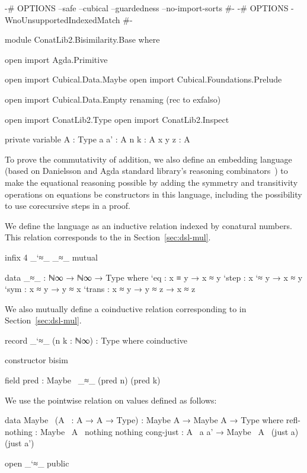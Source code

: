 \begin{code}[hide]
{-# OPTIONS --safe --cubical --guardedness --no-import-sorts #-}
{-# OPTIONS -WnoUnsupportedIndexedMatch #-}

module ConatLib2.Bisimilarity.Base where

open import Agda.Primitive

open import Cubical.Data.Maybe
open import Cubical.Foundations.Prelude

open import Cubical.Data.Empty
  renaming (rec to exfalso)

open import ConatLib2.Type
open import ConatLib2.Inspect

private variable
  A : Type
  a a' : A
  n k : A
  x y z : A
\end{code}
To prove the commutativity of addition, we also define an embedding language
(based on Danielsson \cite{danielsson-beating} and Agda standard library's
 reasoning combinators~\cite{agda-stdlib}) to make the equational
reasoning possible by adding the symmetry and transitivity operations on
equations be constructors in this language, including the possibility to use
corecursive steps in a proof.

We define the language as an inductive relation indexed by conatural numbers.
This relation corresponds to the  in
Section~\ref{sec:dsl-mul}.
\begin{code}[hide]
infix 4 _`≈_ _≈_
mutual
\end{code}
\begin{code}
  data _≈_ : ℕ∞ → ℕ∞ → Type where
    `eq     : x ≡ y → x ≈ y
    `step   : x `≈ y → x ≈ y
    `sym    : x ≈ y → y ≈ x
    `trans  : x ≈ y → y ≈ z → x ≈ z
\end{code}
\begin{AgdaMultiCode}
We also mutually define a coinductive relation corresponding to
 in Section~\ref{sec:dsl-mul}.
\begin{code}
  record _`≈_ (n k : ℕ∞) : Type where
    coinductive
\end{code}
\begin{code}[hide]
    constructor bisim
\end{code}
\begin{code}
    field
      pred : Maybe~ _≈_ (pred n) (pred k)
\end{code}
\end{AgdaMultiCode}
We use the pointwise relation on  values defined as follows:
\begin{code}
  data Maybe~ (A~ : A → A → Type) :
    Maybe A → Maybe A → Type
    where
      refl-nothing : Maybe~ A~ nothing nothing
      cong-just : A~ a a' → Maybe~ A~ (just a) (just a')
\end{code}
\begin{code}[hide]
open _`≈_ public
\end{code}

